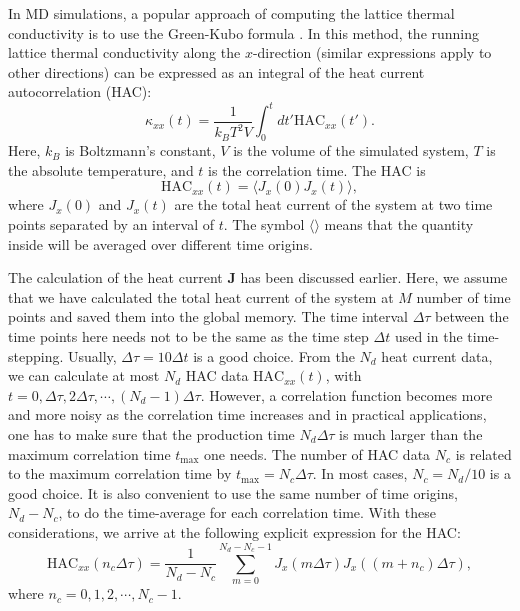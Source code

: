 \documentclass[12pt,a4paper]{report}
\newcommand{\vect}[1]{\boldsymbol{#1}}
\begin{document}
In MD simulations, a popular approach of computing the lattice thermal conductivity is to use the Green-Kubo formula \cite{green1954jcp,kubo1957jpsj}.
In this method, the running lattice thermal conductivity along the $x$-direction (similar expressions apply to other directions) can be expressed as an integral of the heat current autocorrelation (HAC):
\begin{equation}
\label{equation:green-kubo-kappa}
\boxed{
\kappa_{xx}(t) = \frac{1}{k_BT^2V} \int_0^{t} dt' \text{HAC}_{xx}(t')
}.
\end{equation}
Here, $k_B$ is Boltzmann's constant, $V$ is the volume of the simulated system, $T$ is the absolute temperature, and $t$ is the correlation time. The HAC is
\begin{equation}
\boxed{
\text{HAC}_{xx}(t)=\langle J_{x}(0)J_{x}(t)\rangle
},
\end{equation}
where $J_{x}(0)$ and $J_{x}(t)$ are the total heat current of the system at two time points separated by an interval of $t$. The symbol $\langle \rangle$ means that the quantity inside will be averaged over different time origins.

The calculation of the heat current $\vect{J}$ has been discussed earlier. Here, we assume that we have calculated the total heat current of the system at $M$ number of time points and saved them into the global memory. The time interval
$\Delta \tau$ between the time points here needs not to be the same as the time step $\Delta t$ used in the time-stepping. Usually, $\Delta \tau = 10 \Delta t$ is a good choice. From the $N_d$ heat current data, we can calculate at most $N_d$ HAC data $\text{HAC}_{xx}(t)$, with $t=0, \Delta \tau, 2\Delta \tau, \cdots, (N_d-1)\Delta \tau$. However, a correlation function becomes more and more noisy as the correlation time increases and in practical applications, one has to make sure that the production time $N_d\Delta \tau$ is much larger than the maximum correlation time $t_{\text{max}}$ one needs. The number of HAC data $N_c$ is related to the maximum correlation time by $t_{\text{max}} = N_c \Delta \tau$. In most cases, $N_c=N_d/10$ is a good choice. It is also convenient to use the same number of time origins, $N_d-N_c$, to do the time-average for each correlation time.  With these considerations, we arrive at the following explicit expression for the HAC:
\begin{equation}
\label{equation:HAC}
\text{HAC}_{xx}(n_c\Delta \tau) = \frac{1}{N_d-N_c}
\sum_{m=0}^{N_d-N_c-1}
J_x(m\Delta \tau) J_x((m+n_c)\Delta \tau),
\end{equation}
where $n_c = 0, 1, 2, \cdots, N_c-1$.
\end{document}

